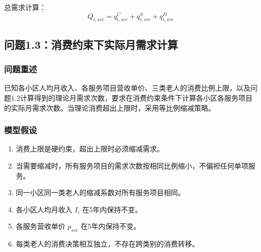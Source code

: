 \documentclass[12pt,a4paper]{article}
\begin{document}
总需求计算：
\begin{equation}
Q_{i,svc} = q_{i,svc}^C + q_{i,svc}^S + q_{i,svc}^D
\tag{2.4}
\end{equation}

\subsection{问题1.3：消费约束下实际月需求计算}

\subsubsection{问题重述}
已知各小区人均月收入、各服务项目营收单价、三类老人的消费比例上限，以及问题1.2计算得到的理论月需求次数，要求在消费约束条件下计算各小区各服务项目的实际月需求次数。当理论消费超出上限时，采用等比例缩减策略。

\subsubsection{模型假设}
\begin{enumerate}
    \item 消费上限是硬约束，超出上限时必须缩减需求。
    \item 当需要缩减时，所有服务项目的需求次数按相同比例缩小，不偏袒任何单项服务。
    \item 同一小区同一类老人的缩减系数对所有服务项目相同。
    \item 各小区人均月收入 $I_i$ 在5年内保持不变。
    \item 各服务营收单价 $p_{svc}$ 在5年内保持不变。
    \item 每类老人的消费决策相互独立，不存在跨类别的消费转移。
\end{enumerate}
\end{document}
